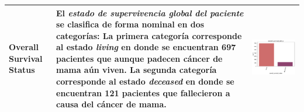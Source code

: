 \begin{table}[!htb]
\begin{threeparttable}
\begin{tabular}{p{2.5cm} p{7cm} p{6.5cm}}
			Overall Survival Status
			& El \textit{estado de supervivencia global del paciente} se clasifica de forma nominal en dos categorías: La primera categoría corresponde al estado \textit{living} en donde se encuentran 697 pacientes que aunque padecen cáncer de mama aún viven. La segunda categoría corresponde al estado \textit{deceased} en donde se encuentran 121 pacientes que fallecieron a causa del cáncer de mama. 
			& \begin{center}\includegraphics[width=1\linewidth]{NOTEBOOK/IMAGENES_DESCRIPTIVAS/33_overall_survival_status}\end{center}
			\\ \hline

		\end{tabular}
	\end{threeparttable}
\end{table}

